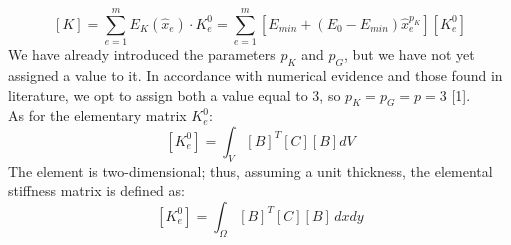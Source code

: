 \documentclass{article}
\begin{document}
\begin{equation}\label{eq:global_k}
[K] = \sum_{e=1}^{m} E_K(\hat{x}_e) \cdot K_e^0 = \sum_{e=1}^{m} [E_{min} + (E_0 - E_{min})\hat{x}_e^{p_K}][K_e^0]
\end{equation}
\noindent We have already introduced the parameters $p_K$ and $p_G$, but we have not yet assigned a value to it. In accordance with numerical evidence and those found in literature, we opt to assign both a value equal to 3, so $p_K = p_G = p = 3$ [1]. \\
\noindent As for the elementary matrix $K_e^0$:
\begin{equation}\label{eq:ke0_vol}
[K_e^0] = \int_V [B]^T [C] [B] dV
\end{equation}
\noindent The element is two-dimensional; thus, assuming a unit thickness, the elemental stiffness matrix is defined as:
\begin{equation}\label{eq:ke0_omega}
[K_e^0] = \int_\Omega [B]^T [C] [B] \, dxdy
\end{equation}
\end{document}
